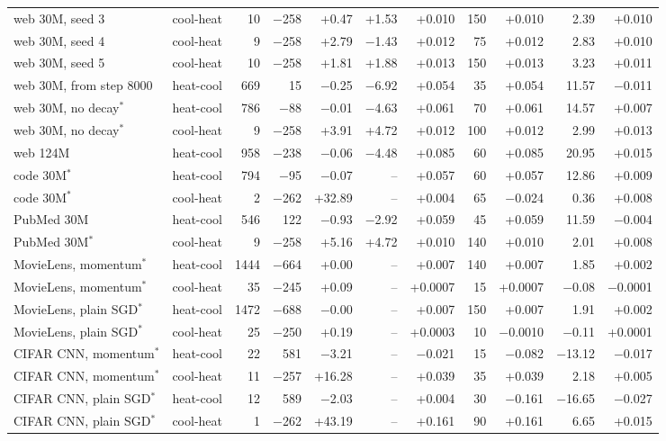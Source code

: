\begin{tabular}{llrrrrrrrrr}
web 30M, seed 3 & cool-heat & 10 & $-$258 & +0.47 & +1.53 & +0.010 & 150 & +0.010 & 2.39 & +0.010\\
web 30M, seed 4 & cool-heat & 9 & $-$258 & +2.79 & $-$1.43 & +0.012 & 75 & +0.012 & 2.83 & +0.010\\
web 30M, seed 5 & cool-heat & 10 & $-$258 & +1.81 & +1.88 & +0.013 & 150 & +0.013 & 3.23 & +0.011\\
web 30M, from step 8000 & heat-cool & 669 & 15 & $-$0.25 & $-$6.92 & +0.054 & 35 & +0.054 & 11.57 & $-$0.011\\
web 30M, no decay$^{*}$ & heat-cool & 786 & $-$88 & $-$0.01 & $-$4.63 & +0.061 & 70 & +0.061 & 14.57 & +0.007\\
web 30M, no decay$^{*}$ & cool-heat & 9 & $-$258 & +3.91 & +4.72 & +0.012 & 100 & +0.012 & 2.99 & +0.013\\
web 124M & heat-cool & 958 & $-$238 & $-$0.06 & $-$4.48 & +0.085 & 60 & +0.085 & 20.95 & +0.015\\
code 30M$^{*}$ & heat-cool & 794 & $-$95 & $-$0.07 & -- & +0.057 & 60 & +0.057 & 12.86 & +0.009\\
code 30M$^{*}$ & cool-heat & 2 & $-$262 & +32.89 & -- & +0.004 & 65 & $-$0.024 & 0.36 & +0.008\\
PubMed 30M & heat-cool & 546 & 122 & $-$0.93 & $-$2.92 & +0.059 & 45 & +0.059 & 11.59 & $-$0.004\\
PubMed 30M$^{*}$ & cool-heat & 9 & $-$258 & +5.16 & +4.72 & +0.010 & 140 & +0.010 & 2.01 & +0.008\\
MovieLens, momentum$^{*}$ & heat-cool & 1444 & $-$664 & +0.00 & -- & +0.007 & 140 & +0.007 & 1.85 & +0.002\\
MovieLens, momentum$^{*}$ & cool-heat & 35 & $-$245 & +0.09 & -- & +0.0007 & 15 & +0.0007 & $-$0.08 & $-$0.0001\\
MovieLens, plain SGD$^{*}$ & heat-cool & 1472 & $-$688 & $-$0.00 & -- & +0.007 & 150 & +0.007 & 1.91 & +0.002\\
MovieLens, plain SGD$^{*}$ & cool-heat & 25 & $-$250 & +0.19 & -- & +0.0003 & 10 & $-$0.0010 & $-$0.11 & +0.0001\\
CIFAR CNN, momentum$^{*}$ & heat-cool & 22 & 581 & $-$3.21 & -- & $-$0.021 & 15 & $-$0.082 & $-$13.12 & $-$0.017\\
CIFAR CNN, momentum$^{*}$ & cool-heat & 11 & $-$257 & +16.28 & -- & +0.039 & 35 & +0.039 & 2.18 & +0.005\\
CIFAR CNN, plain SGD$^{*}$ & heat-cool & 12 & 589 & $-$2.03 & -- & +0.004 & 30 & $-$0.161 & $-$16.65 & $-$0.027\\
CIFAR CNN, plain SGD$^{*}$ & cool-heat & 1 & $-$262 & +43.19 & -- & +0.161 & 90 & +0.161 & 6.65 & +0.015\\
\bottomrule
\end{tabular}
